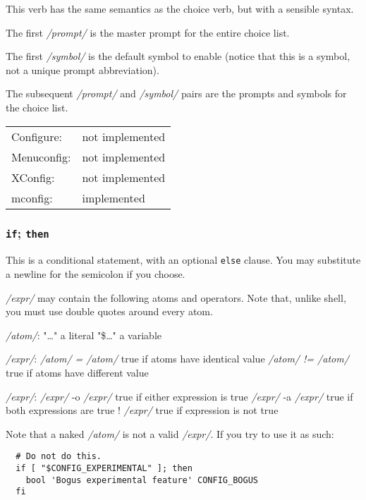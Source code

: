 This verb has the same semantics as the choice verb, but with a sensible
syntax.

The first \textit{/prompt/} is the master prompt for the entire choice list.

The first \textit{/symbol/} is the default symbol to enable (notice that this
is a symbol, not a unique prompt abbreviation).

The subsequent \textit{/prompt/} and \textit{/symbol/} pairs are the prompts and symbols
for the choice list.

\begin{tabular}{ll}
Configure:  &not implemented\\
Menuconfig: &not implemented\\
XConfig:    &not implemented\\
mconfig:    &implemented\\
\end{tabular}



\subsubsection{\texttt{if}\quad; \quad\texttt{then}}

This is a conditional statement, with an optional \texttt{else} clause.  You may
substitute a newline for the semicolon if you choose.

\textit{/expr/} may contain the following atoms and operators.  Note that, 
unlike shell, you must use double quotes around every atom.

    \textit{/atom/}:
        "\dots"                 a literal
        "\$\dots"                       a variable

    \textit{/expr/}:
        \textit{/atom/  = /atom/}       true if atoms have identical value
        \textit{/atom/ != /atom/}       true if atoms have different value

    \textit{/expr/}:
        \textit{/expr/} -o \textit{/expr/}      true if either expression is true
        \textit{/expr/} -a \textit{/expr/}      true if both expressions are true
        ! \textit{/expr/}               true if expression is not true

Note that a naked \textit{/atom/} is not a valid \textit{/expr/}.  If you try to use it
as such:

{\small\begin{verbatim}
  # Do not do this.
  if [ "$CONFIG_EXPERIMENTAL" ]; then
    bool 'Bogus experimental feature' CONFIG_BOGUS
  fi
\end{verbatim}}

